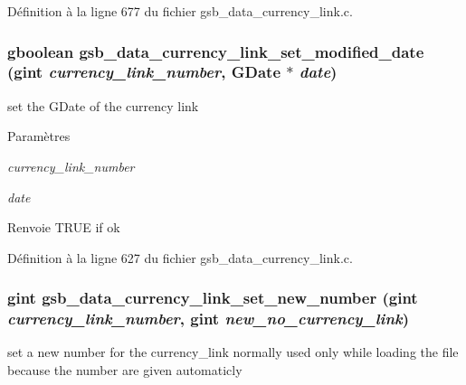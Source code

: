 Définition à la ligne 677 du fichier gsb\_\-data\_\-currency\_\-link.c.

\subsubsection[{gsb\_\-data\_\-currency\_\-link\_\-set\_\-modified\_\-date}]{\setlength{\rightskip}{0pt plus 5cm}gboolean gsb\_\-data\_\-currency\_\-link\_\-set\_\-modified\_\-date (gint {\em currency\_\-link\_\-number}, \/  GDate $\ast$ {\em date})}\label{gsb__data__currency__link_8c_a45a0f10f5738e9fc8118bd99442e6366}
set the GDate of the currency link


\begin{DoxyParams}{Paramètres}
\item[{\em currency\_\-link\_\-number}]\item[{\em date}]\end{DoxyParams}
\begin{DoxyReturn}{Renvoie}
TRUE if ok 
\end{DoxyReturn}


Définition à la ligne 627 du fichier gsb\_\-data\_\-currency\_\-link.c.

\subsubsection[{gsb\_\-data\_\-currency\_\-link\_\-set\_\-new\_\-number}]{\setlength{\rightskip}{0pt plus 5cm}gint gsb\_\-data\_\-currency\_\-link\_\-set\_\-new\_\-number (gint {\em currency\_\-link\_\-number}, \/  gint {\em new\_\-no\_\-currency\_\-link})}\label{gsb__data__currency__link_8c_afcae5a85a8cd075e218f6eb7d3a4669a}
set a new number for the currency\_\-link normally used only while loading the file because the number are given automaticly


